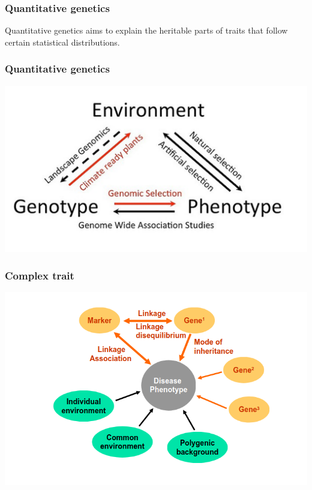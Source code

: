 \documentclass{beamer}
\title[Quantitative genetics] %
{\color{mdtRed}{Quantitative genetics from genome assemblies to neural network aided omics-based prediction of complex traits}}
\author{Jan Freudenthal}
\institute[CCTB] %
{
  CCTB \\
  Evolutionary genomics \\
  Julius-Maximilians-Universität Würzburg
}
\date{31. Jan 2020}
\begin{document}
\frame{\titlepage}

\begin{frame}
  \frametitle{Quantitative genetics}
  Quantitative genetics aims to explain the heritable parts of traits that follow certain statistical distributions.
\end{frame}


\begin{frame}
    \frametitle{Quantitative genetics}
    \includegraphics[width=.98\textwidth, height=.8\textheight]{../Figures/gxe.png}
\end{frame}

\begin{frame}
    \frametitle{Complex trait}
    \includegraphics[width=.98\textwidth, height=.8\textheight]{../Figures/complex_trait.png}
\end{frame}
\end{document}
